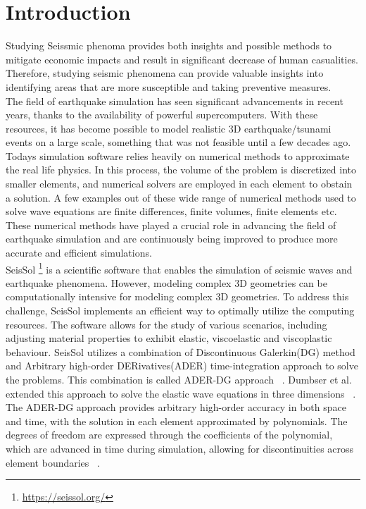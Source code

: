 
\chapter{Introduction}\label{chapter:introduction}

Studying Seissmic phenoma provides both insights and possible methods to mitigate economic impacts and result in significant decrease of human casualities.
Therefore, studying seismic phenomena can provide valuable insights into identifying areas that are more susceptible and taking preventive measures. \\

The field of earthquake simulation has seen significant advancements in recent years, thanks to the availability of powerful supercomputers.
With these resources, it has become possible to model realistic 3D earthquake/tsunami events on a large scale, something that was not feasible until a few decades ago. 
Todays simulation software relies heavily on numerical methods to approximate the real life physics. In this process, the volume of the problem is discretized into smaller elements, and numerical solvers are employed in each element to obstain a solution.
A few examples out of these wide range of numerical methods used to solve wave equations are finite differences, finite volumes, finite elements etc. These numerical methods have played a crucial role in advancing the field of earthquake simulation and are continuously being improved to produce more accurate and efficient simulations. \\

SeisSol \footnote{\url{https://seissol.org/}} is a scientific software that enables the simulation of seismic waves and earthquake phenomena. However, modeling complex 3D geometries can be computationally intensive for modeling complex 3D geometries.
To address this challenge, SeisSol implements an efficient way to optimally utilize the computing resources. The software allows for the study of various scenarios, including adjusting material properties to exhibit elastic, viscoelastic and viscoplastic behaviour.
SeisSol utilizes a combination of Discontinuous Galerkin(DG) method and Arbitrary high-order DERivatives(ADER) time-integration approach to solve the problems.
This combination is called ADER-DG approach ~\parencite{dumbser}. Dumbser et al. extended this approach to solve the elastic wave equations in three dimensions ~\parencite{dumbser1}. The ADER-DG approach provides arbitrary high-order accuracy in both space and time, with the solution in each element approximated by polynomials.
The degrees of freedom are expressed through the coefficients of the polynomial, which are advanced in time during simulation, allowing for discontinuities across element boundaries ~\parencite{martin}. \\


